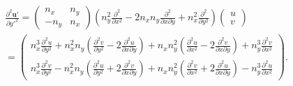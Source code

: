 \documentclass[review]{elsarticle}
\begin{document}
\begin{equation}\label{du'2dy'2}
	\begin{gathered}
		\frac{\partial^2{\bm{u}'}}{\partial{y'^2}} 
			= \left(\begin{array}{cc}
				n_x & n_y \\
				-n_y & n_x
				\end{array} \right) 
			  \left( n_y^2\frac{\partial^2}{\partial x^2}-2n_xn_y\frac{\partial^2}{\partial x\partial y}
				  +n_x^2\frac{\partial^2}{\partial y^2}\right) 
			  \left(\begin{array}{c} u \\ v \end{array} \right)\\
	        = \left(\begin{array}{c}
		        n_x^3\frac{\partial^2u}{\partial y^2}
		        +n_x^2n_y\left(\frac{\partial^2 v}{\partial y^2}-2\frac{\partial^2 u}{\partial x\partial y}\right)
		        +n_xn_y^2\left(\frac{\partial^2 u}{\partial x^2}-2\frac{\partial^2 v}{\partial x\partial y}\right)
		        +n_y^3\frac{\partial^2 v}{\partial x^2}\\
		        n_x^3\frac{\partial^2v}{\partial y^2}
		        -n_x^2n_y\left(\frac{\partial^2 u}{\partial y^2}+2\frac{\partial^2 v}{\partial x\partial y}\right)
		        +n_xn_y^2\left(\frac{\partial^2 v}{\partial x^2}+2\frac{\partial^2 u}{\partial x\partial y}\right)
		        -n_y^3\frac{\partial^2 u}{\partial x^2}
		        \end{array}\right).
	\end{gathered}
\end{equation}

%
\end{document}
